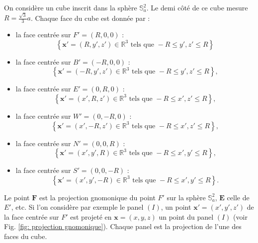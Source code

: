 On considère un cube inscrit dans la sphère $\mathbb{S}_a^2$. Le demi côté de ce cube mesure $R=\frac{\sqrt{3}}{3}a$. Chaque face du cube est donnée par :
\begin{itemize}
\item la face centrée sur $F'=(R,0,0)$ : 
\begin{equation}
\left\lbrace
\mathbf{x}' = (R,y',z') \in \mathbb{R}^3 \text{ tels que } -R  \leq y',z' \leq R
\right\rbrace
\end{equation}

\item la face centrée sur $B'=(-R,0,0)$ : 
\begin{equation}
\left\lbrace
\mathbf{x}' = (-R,y',z') \in \mathbb{R}^3 \text{ tels que } -R  \leq y',z' \leq R
\right\rbrace ,
\end{equation}

\item la face centrée sur $E'=(0,R,0)$ : 
\begin{equation}
\left\lbrace
\mathbf{x}' = (x',R,z') \in \mathbb{R}^3 \text{ tels que } -R  \leq x',z' \leq R
\right\rbrace ,
\end{equation}

\item la face centrée sur $W'=(0,-R,0)$ : 
\begin{equation}
\left\lbrace
\mathbf{x}' = (x',-R,z') \in \mathbb{R}^3 \text{ tels que } -R  \leq x',z' \leq R
\right\rbrace ,
\end{equation}

\item la face centrée sur $N'=(0,0,R)$ : 
\begin{equation}
\left\lbrace
\mathbf{x}' = (x',y',R) \in \mathbb{R}^3 \text{ tels que } -R  \leq x',y' \leq R
\right\rbrace ,
\end{equation}

\item la face centrée sur $S'=(0,0,-R)$ : 
\begin{equation}
\left\lbrace
\mathbf{x}' = (x',y',-R) \in \mathbb{R}^3 \text{ tels que } -R  \leq x',y' \leq R
\right\rbrace .
\end{equation}
\end{itemize}

Le point $\mathbf{F}$ est la projection gnomonique du point $F'$ sur la sphère $\mathbb{S}_a^2$, $\mathbf{E}$ celle de $E'$, etc.
Si l'on considère par exemple le panel $(I)$, un point $\mathbf{x}'=(x',y',z')$ de la face centrée sur $F'$ est projeté en $\mathbf{x} = (x,y,z)$ un point du panel $(I)$ (voir Fig. \ref{fig: projection gnomonique}). Chaque panel est la projection de l'une des faces du cube.

